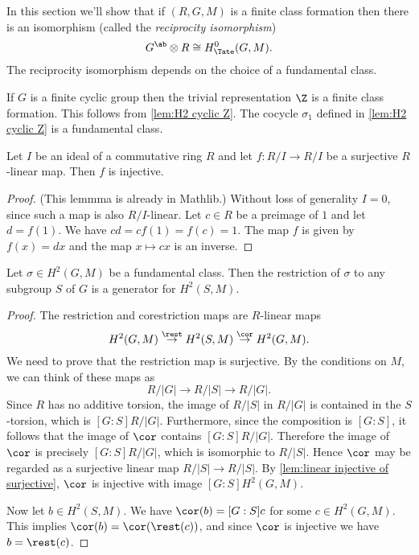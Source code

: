 In this section we'll show that if $(R,G,M)$ is a finite class formation
then there is an isomorphism (called the \emph{reciprocity isomorphism})
\[
	G^{\ab} \otimes R \cong H^0_{\Tate}(G,M).
\]
The reciprocity isomorphism depends on the choice of a fundamental class.

\begin{example}
	If $G$ is a finite cyclic group then the trivial representation $\Z$
	is a finite class formation.
	This follows from \ref{lem:H2 cyclic Z}.
	The cocycle $\sigma_1$ defined in \ref{lem:H2 cyclic Z} is a fundamental class.
\end{example}

\begin{lemma} \label{lem:linear injective of surjective}
	\mathlibok
	Let $I$ be an ideal of a commutative ring $R$ and let $f:R/I \to R/I$
	be a surjective $R$-linear map.
	Then $f$ is injective.
\end{lemma}

\begin{proof}
	\mathlibok
	(This lemmma is already in Mathlib.)
	Without loss of generality $I=0$, since such a map is also $R/I$-linear.
	Let $c\in R$ be a preimage of $1$ and let $d = f(1)$.
	We have $cd = cf(1) = f(c) = 1$.
	The map $f$ is given by $f(x) = dx$ and the map $x \mapsto cx$ is an inverse.
\end{proof}

\begin{lemma} \label{lem:restriction fundamental class generates}
	Let $\sigma \in H^2(G,M)$ be a fundamental class.
	Then the restriction of $\sigma$ to any subgroup $S$ of $G$
	is a generator for $H^2(S,M)$.
\end{lemma}

\begin{proof}
	The restriction and corestriction maps are $R$-linear maps
	\[
		H^2(G,M) \stackrel{\rest}\to H^2(S,M) \stackrel{\cor}\to H^2(G,M).
	\]
	We need to prove that the restriction map is surjective.
	By the conditions on $M$, we can think of these maps as
	\[
		R / |G| \to R / |S| \to R / |G|.
	\]
	Since $R$ has no additive torsion, the image of $R/|S|$ in $R/|G|$
	is contained in the $S$-torsion, which is $[G:S] R / |G|$.
	Furthermore, since the composition is $[G:S]$,
	it follows that the image of $\cor$ contains $[G:S] R / |G|$.
	Therefore the image of $\cor$ is precisely $[G:S] R / |G|$, which
	is isomorphic to $R/|S|$. Hence $\cor$ may be regarded as a surjective linear map
	$R/|S| \to R/|S|$.
	By \ref{lem:linear injective of surjective}, $\cor$ is injective with image
	$[G:S] H^2(G,M)$.

	Now let $b \in H^2(S,M)$. We have $\cor(b) = [G:S]c$ for some $c \in H^2(G,M)$.
	This implies $\cor(b) = \cor (\rest( c))$, and since $\cor$ is injective we have
	$b = \rest(c)$.
\end{proof}


